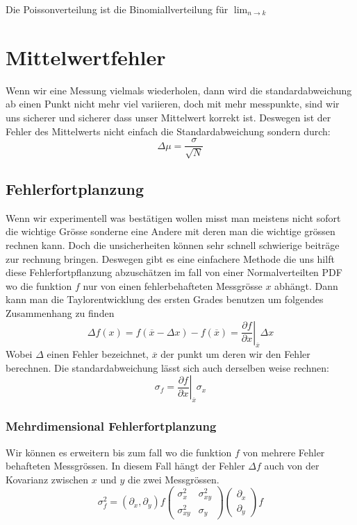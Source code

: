 \documentclass{article}
\begin{document}
Die Poissonverteilung ist die Binomiallverteilung für $\lim_{n\rightarrow k}$
\hypertarget{mittelwertfehler}{\section*{Mittelwertfehler}}
Wenn wir eine Messung vielmals wiederholen, dann wird die standardabweichung ab einen Punkt nicht mehr viel variieren, doch mit mehr messpunkte, sind wir uns sicherer und sicherer dass unser Mittelwert korrekt ist. Deswegen ist der Fehler des Mittelwerts nicht einfach die Standardabweichung sondern durch:
\[\Delta \mu=\frac{\sigma}{\sqrt{N}}\]
\hypertarget{fehlerfortplanzung}{\subsection*{Fehlerfortplanzung}}
Wenn wir experimentell was bestätigen wollen misst man meistens nicht sofort die wichtige Grösse sonderne eine Andere mit
deren man die wichtige grössen rechnen kann. Doch die unsicherheiten können sehr schnell schwierige beiträge zur rechnung bringen.
Deswegen gibt es eine einfachere Methode die uns hilft diese Fehlerfortpflanzung abzuschätzen im fall von einer Normalverteilten PDF
wo die funktion $f$ nur von einen fehlerbehafteten Messgrösse $x$ abhängt. 
Dann kann man die Taylorentwicklung des ersten Grades benutzen um folgendes Zusammenhang zu finden
\[\Delta f(x)=f(\overline{x}-\Delta x)-f(\overline{x})=\left.\frac{\partial f}{\partial x}\right|_{\overline{x}}\Delta x\]
Wobei $\Delta$ einen Fehler bezeichnet, $\overline{x}$ der punkt um deren wir den Fehler berechnen. Die standardabweichung lässt sich auch derselben weise rechnen:
\[\sigma_f=\left.\frac{\partial f}{\partial x}\right|_ {\overline{x}}\sigma_x\]
\hypertarget{mehrdimensionalefehlerfortpflanzung}{\subsubsection*{Mehrdimensional Fehlerfortplanzung}}
Wir können es erweitern bis zum fall wo die funktion $f$ von mehrere Fehler behafteten Messgrössen. In diesem Fall hängt der
Fehler $\Delta f$ auch von der Kovarianz zwischen $x$ und $y$ die zwei Messgrössen.
\[\sigma_f^2=(\partial_x,\partial_y)f\begin{pmatrix}\sigma_x^2&\sigma_{xy}^2\\\sigma_{xy}^2&\sigma_y\end{pmatrix}\begin{pmatrix}\partial_x\\\partial_y\end{pmatrix}f\]
\end{document}
